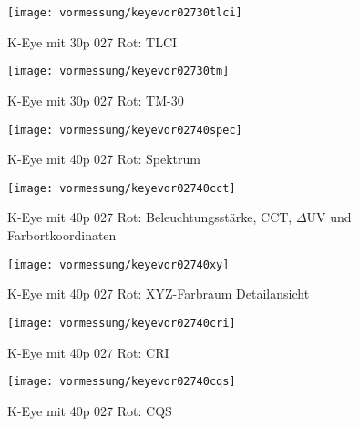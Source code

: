 \documentclass[pagesize,paper=A4,fontsize=12pt,utf8,numbers=noenddot,bibliography=totoc,listof=totoc,DIV=11,BCOR=1mm]{scrreprt}
\begin{document}
\begin{figure}[htp]     %
\centering
\texttt{[image: vormessung/keyevor02730tlci]} 
\caption {K-Eye mit 30p 027 Rot: TLCI} 
\end{figure}

\begin{figure}[htp]     %
\centering
\texttt{[image: vormessung/keyevor02730tm]} 
\caption {K-Eye mit 30p 027 Rot: TM-30} 
\end{figure}



\begin{figure}[htp]     %
\centering
\texttt{[image: vormessung/keyevor02740spec]} 
\caption {K-Eye mit 40p 027 Rot: Spektrum} 
\end{figure}

\begin{figure}[htp]     %
\centering
\texttt{[image: vormessung/keyevor02740cct]} 
\caption {K-Eye mit 40p 027 Rot: Beleuchtungsstärke, CCT, $\Delta$UV und Farbortkoordinaten} 
\end{figure}

\begin{figure}[htp]     %
\centering
\texttt{[image: vormessung/keyevor02740xy]} 
\caption {K-Eye mit 40p 027 Rot: XYZ-Farbraum Detailansicht} 
\end{figure}

\begin{figure}[htp]     %
\centering
\texttt{[image: vormessung/keyevor02740cri]} 
\caption {K-Eye mit 40p 027 Rot: CRI} 
\end{figure}

\begin{figure}[htp]     %
\centering
\texttt{[image: vormessung/keyevor02740cqs]} 
\caption {K-Eye mit 40p 027 Rot: CQS} 
\end{figure}
\end{document}
